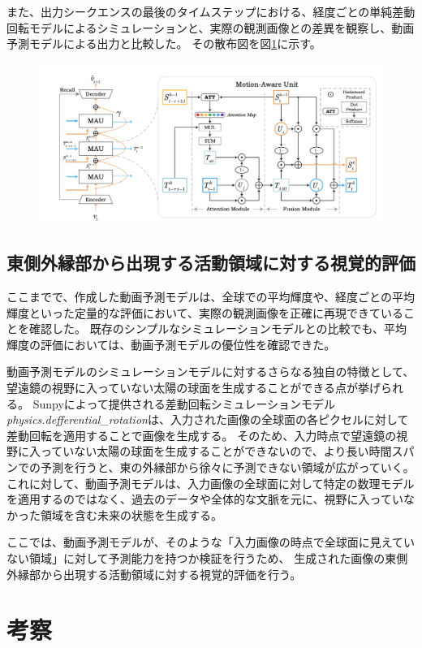           また、出力シークエンスの最後のタイムステップにおける、経度ごとの単純差動回転モデルによるシミュレーションと、実際の観測画像との差異を観察し、動画予測モデルによる出力と比較した。
          その散布図を図\ref{fig:exp1_sdr_longitude_scatter}に示す。
          \begin{figure}[htbp]
            \centering
            \includegraphics[width=\textwidth]{figures/mau.png}
            \caption{}
            \label{fig:exp1_sdr_longitude_scatter}
          \end{figure}
    
    \subsection{東側外縁部から出現する活動領域に対する視覚的評価}
      ここまでで、作成した動画予測モデルは、全球での平均輝度や、経度ごとの平均輝度といった定量的な評価において、実際の観測画像を正確に再現できていることを確認した。
      既存のシンプルなシミュレーションモデルとの比較でも、平均輝度の評価においては、動画予測モデルの優位性を確認できた。

      動画予測モデルのシミュレーションモデルに対するさらなる独自の特徴として、望遠鏡の視野に入っていない太陽の球面を生成することができる点が挙げられる。
      Sunpyによって提供される差動回転シミュレーションモデル\textit{physics.defferential\_rotation}は、入力された画像の全球面の各ピクセルに対して差動回転を適用することで画像を生成する。
      そのため、入力時点で望遠鏡の視野に入っていない太陽の球面を生成することができないので、より長い時間スパンでの予測を行うと、東の外縁部から徐々に予測できない領域が広がっていく。
      これに対して、動画予測モデルは、入力画像の全球面に対して特定の数理モデルを適用するのではなく、過去のデータや全体的な文脈を元に、視野に入っていなかった領域を含む未来の状態を生成する。
      
      ここでは、動画予測モデルが、そのような「入力画像の時点で全球面に見えていない領域」に対して予測能力を持つか検証を行うため、 生成された画像の東側外縁部から出現する活動領域に対する視覚的評価を行う。
      

  \section{考察}

